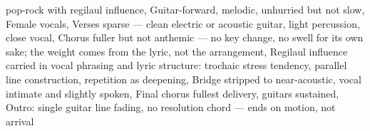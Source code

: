 

\begin{notes}
\end{notes}

\begin{style}
pop-rock with regilaul influence, Guitar-forward, melodic, unhurried but not slow, Female vocals, Verses sparse — clean electric or acoustic guitar, light percussion, close vocal, Chorus fuller but not anthemic — no key change, no swell for its own sake; the weight comes from the lyric, not the arrangement, Regilaul influence carried in vocal phrasing and lyric structure: trochaic stress tendency, parallel line construction, repetition as deepening, Bridge stripped to near-acoustic, vocal intimate and slightly spoken, Final chorus fullest delivery, guitars sustained, Outro: single guitar line fading, no resolution chord — ends on motion, not arrival
\end{style}

